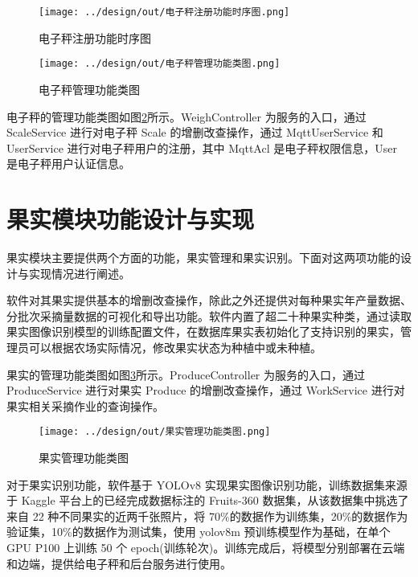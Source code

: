 \begin{figure}
    \centering
    \texttt{[image: ../design/out/电子秤注册功能时序图.png]}
    \caption{电子秤注册功能时序图}
    \label{fig:电子秤注册功能时序图}
\end{figure}

\begin{figure}
    \centering
    \texttt{[image: ../design/out/电子秤管理功能类图.png]}
    \caption{电子秤管理功能类图}
    \label{fig:电子秤管理功能类图}
\end{figure}

电子秤的管理功能类图如图\ref{fig:电子秤管理功能类图}所示。WeighController 为服务的入口，通过 ScaleService 进行对电子秤 Scale 的增删改查操作，通过 MqttUserService 和 UserService 进行对电子秤用户的注册，其中 MqttAcl 是电子秤权限信息，User 是电子秤用户认证信息。

\section{果实模块功能设计与实现}\label{sec:produce-mode}

果实模块主要提供两个方面的功能，果实管理和果实识别。下面对这两项功能的设计与实现情况进行阐述。

软件对其果实提供基本的增删改查操作，除此之外还提供对每种果实年产量数据、分批次采摘量数据的可视化和导出功能。软件内置了超二十种果实种类，通过读取果实图像识别模型的训练配置文件，在数据库果实表初始化了支持识别的果实，管理员可以根据农场实际情况，修改果实状态为种植中或未种植。

果实的管理功能类图如图\ref{fig:果实管理功能类图}所示。ProduceController 为服务的入口，通过 ProduceService 进行对果实 Produce 的增删改查操作，通过 WorkService 进行对果实相关采摘作业的查询操作。

\begin{figure}
    \centering
    \texttt{[image: ../design/out/果实管理功能类图.png]}
    \caption{果实管理功能类图}
    \label{fig:果实管理功能类图}
\end{figure}

对于果实识别功能，软件基于 YOLOv8 实现果实图像识别功能，训练数据集来源于 Kaggle 平台上的已经完成数据标注的 Fruits-360 数据集，从该数据集中挑选了来自 22 种不同果实的近两千张照片，将 70\%的数据作为训练集，20\%的数据作为验证集，10\%的数据作为测试集，使用 yolov8m 预训练模型作为基础，在单个 GPU P100 上训练 50 个 epoch(训练轮次)。训练完成后，将模型分别部署在云端和边端，提供给电子秤和后台服务进行使用。

